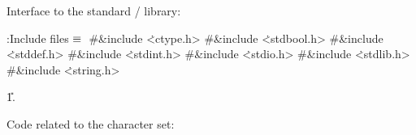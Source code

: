 Interface to the standard \CEE/ library:

\Y\B\4:Include files\X${}\equiv{}$\6
\8\#\&{include} \.{<ctype.h>}\6
\8\#\&{include} \.{<stdbool.h>}\6
\8\#\&{include} \.{<stddef.h>}\6
\8\#\&{include} \.{<stdint.h>}\6
\8\#\&{include} \.{<stdio.h>}\6
\8\#\&{include} \.{<stdlib.h>}\6
\8\#\&{include} \.{<string.h>}\par
\U1.\fi

Code related to the character set:

